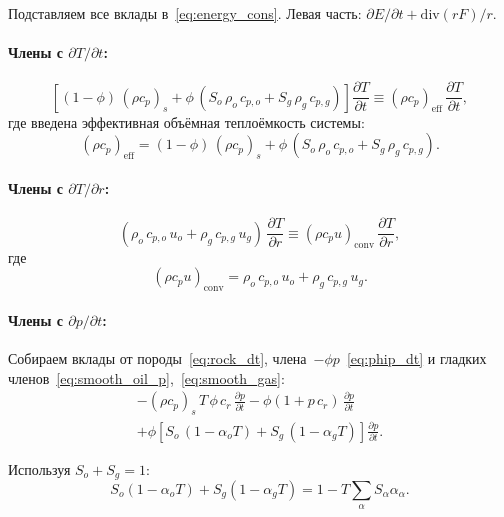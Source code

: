 \documentclass[12pt,a4paper]{article}
\begin{document}
Подставляем все вклады в~\eqref{eq:energy_cons}. Левая часть:
$\partial E/\partial t + \mathrm{div}(rF)/r$.

\paragraph{Члены с $\partial T/\partial t$:}
\begin{equation}\label{eq:T_accum}
  \left[(1-\phi)\,(\rho c_p)_s
    + \phi\,(S_o\,\rho_o\,c_{p,o} + S_g\,\rho_g\,c_{p,g})
  \right]\frac{\partial T}{\partial t}
  \equiv (\rho c_p)_{\mathrm{eff}}\,\frac{\partial T}{\partial t},
\end{equation}
где введена эффективная объёмная теплоёмкость системы:
\begin{equation}\label{eq:rhocp_eff}
  \boxed{
    (\rho c_p)_{\mathrm{eff}}
    = (1-\phi)\,(\rho c_p)_s
      + \phi\,(S_o\,\rho_o\,c_{p,o} + S_g\,\rho_g\,c_{p,g}).
  }
\end{equation}

\paragraph{Члены с $\partial T/\partial r$:}
\begin{equation}\label{eq:T_conv}
  (\rho_o\,c_{p,o}\,u_o + \rho_g\,c_{p,g}\,u_g)\,
    \frac{\partial T}{\partial r}
  \equiv (\rho c_p u)_{\mathrm{conv}}\,\frac{\partial T}{\partial r},
\end{equation}
где
\begin{equation}\label{eq:rhocp_conv}
  \boxed{
    (\rho c_p u)_{\mathrm{conv}}
    = \rho_o\,c_{p,o}\,u_o + \rho_g\,c_{p,g}\,u_g.
  }
\end{equation}

\paragraph{Члены с $\partial p/\partial t$:}
Собираем вклады от породы~\eqref{eq:rock_dt},
члена~$-\phi p$~\eqref{eq:phip_dt} и гладких
членов~\eqref{eq:smooth_oil_p},~\eqref{eq:smooth_gas}:
\begin{multline}\label{eq:p_accum}
  -(\rho c_p)_s\,T\,\phi\,c_r\,\frac{\partial p}{\partial t}
  - \phi(1+p\,c_r)\,\frac{\partial p}{\partial t}
  \\
  + \phi\!\left[S_o\,(1-\alpha_o T)
    + S_g\,(1-\alpha_g T)\right]\frac{\partial p}{\partial t}.
\end{multline}

Используя $S_o + S_g = 1$:
\[
  S_o(1-\alpha_o T) + S_g(1-\alpha_g T) = 1 - T\sum_\alpha S_\alpha\alpha_\alpha.
\]
\end{document}
